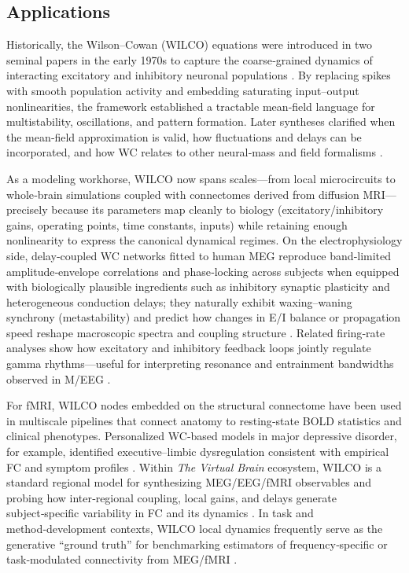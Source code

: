 \documentclass[12pt]{article}
\numberwithin{equation}{section}
\begin{document}
\subsection{Applications}

Historically, the Wilson--Cowan (WILCO) equations were introduced in two seminal papers in the early 1970s to capture the coarse‑grained dynamics of interacting excitatory and inhibitory neuronal populations \cite{WilsonCowan1972,WilsonCowan1973}. By replacing spikes with smooth population activity and embedding saturating input–output nonlinearities, the framework established a tractable mean‑field language for multistability, oscillations, and pattern formation. Later syntheses clarified when the mean‑field approximation is valid, how fluctuations and delays can be incorporated, and how WC relates to other neural‑mass and field formalisms \cite{DestexheSejnowski2009,Cowan2016,ChowKarimipanah2020}.

As a modeling workhorse, WILCO now spans scales—from local microcircuits to whole‑brain simulations coupled with connectomes derived from diffusion MRI—precisely because its parameters map cleanly to biology (excitatory/inhibitory gains, operating points, time constants, inputs) while retaining enough nonlinearity to express the canonical dynamical regimes. On the electrophysiology side, delay‑coupled WC networks fitted to human MEG reproduce band‑limited amplitude‑envelope correlations and phase‑locking across subjects when equipped with biologically plausible ingredients such as inhibitory synaptic plasticity and heterogeneous conduction delays; they naturally exhibit waxing–waning synchrony (metastability) and predict how changes in E/I balance or propagation speed reshape macroscopic spectra and coupling structure \cite{Abeysuriya2018}. Related firing‑rate analyses show how excitatory and inhibitory feedback loops jointly regulate gamma rhythms—useful for interpreting resonance and entrainment bandwidths observed in M/EEG \cite{Keeley2019}.

For fMRI, WILCO nodes embedded on the structural connectome have been used in multiscale pipelines that connect anatomy to resting‑state BOLD statistics and clinical phenotypes. Personalized WC‑based models in major depressive disorder, for example, identified executive–limbic dysregulation consistent with empirical FC and symptom profiles \cite{Li2021MDD}. Within \textit{The Virtual Brain} ecosystem, WILCO is a standard regional model for synthesizing MEG/EEG/fMRI observables and probing how inter‑regional coupling, local gains, and delays generate subject‑specific variability in FC and its dynamics \cite{SanzLeon2013TVB,SanzLeon2015TVB}. In task and method‑development contexts, WILCO local dynamics frequently serve as the generative “ground truth” for benchmarking estimators of frequency‑specific or task‑modulated connectivity from MEG/fMRI \cite{Tewarie2023Nonrev,Masharipov2024}.
\end{document}
